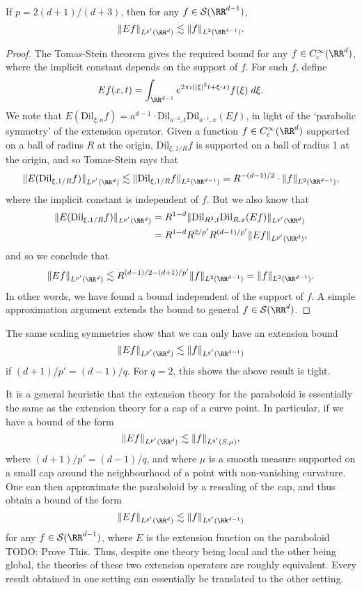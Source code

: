 \begin{theorem}
  If $p = 2(d+1)/(d+3)$, then for any $f \in \mathcal{S}(\RR^{d-1})$,
  \[ \| Ef \|_{L^{p'}(\RR^d)} \lesssim \| f \|_{L^2(\RR^{d-1})}. \]
\end{theorem}
\begin{proof}
  The Tomas-Stein theorem gives the required bound for any $f \in C_c^\infty(\RR^d)$, where the implicit constant depends on the support of $f$. For such $f$, define
  \[ Ef(x,t) = \int_{\RR^{d-1}} e^{2 \pi i (|\xi|^2 t + \xi \cdot x)} f(\xi)\; d\xi. \]
  We note that $E(\text{Dil}_{\xi,a} f) = a^{d-1} \cdot \text{Dil}_{a^{-2},t} \text{Dil}_{a^{-1},x}(Ef)$, in light of the `parabolic symmetry' of the extension operator. Given a function $f \in C_c^\infty(\RR^d)$ supported on a ball of radius $R$ at the origin, $\text{Dil}_{\xi,1/R} f$ is supported on a ball of radius 1 at the origin, and so Tomas-Stein says that
  \[ \| E(\text{Dil}_{\xi,1/R} f) \|_{L^{p'}(\RR^d)} \lesssim \| \text{Dil}_{\xi,1/R} f \|_{L^2(\RR^{d-1})} = R^{-(d-1)/2} \cdot \| f \|_{L^2(\RR^{d-1})}, \]
  where the implicit constant is independent of $f$. But we also know that
  \begin{align*}
    \| E(\text{Dil}_{\xi,1/R} f) \|_{L^{p'}(\RR^d)} &= R^{1-d} \| \text{Dil}_{R^2,t} \text{Dil}_{R,x}(Ef) \|_{L^{p'}(\RR^d)}\\
    &= R^{1-d} R^{2/p'} R^{(d-1)/p'} \| Ef \|_{L^{p'}(\RR^d)},
  \end{align*}
  and so we conclude that
  \[ \| Ef \|_{L^{p'}(\RR^d)} \lesssim R^{(d-1)/2-(d+1)/p'} \| f \|_{L^2(\RR^{d-1})} = \| f \|_{L^2(\RR^{d-1})}. \]
  In other words, we have found a bound independent of the support of $f$. A simple approximation argument extends the bound to general $f \in \mathcal{S}(\RR^d)$.
\end{proof}

\begin{remark}
  The same scaling symmetries show that we can only have an extension bound
  \[ \| Ef \|_{L^{p'}(\RR^d)} \lesssim \| f \|_{L^{q'}(\RR^{d-1})} \]
  if $(d+1)/p' = (d-1)/q$. For $q = 2$, this shows the above result is tight.
\end{remark}

It is a general heuristic that the extension theory for the paraboloid is essentially the same as the extension theory for a cap of a curve point. In particular, if we have a bound of the form
%
\[ \| Ef \|_{L^{p'}(\RR^d)} \lesssim \| f \|_{L^{q'}(S,\mu)}, \]
%
where $(d+1)/p' = (d-1)/q$, and where $\mu$ is a smooth measure supported on a small cap around the neighbourhood of a point with non-vanishing curvature. One can then approximate the paraboloid by a rescaling of the cap, and thus obtain a bound of the form
%
\[ \| Ef \|_{L^{p'}(\RR^d)} \lesssim \| f \|_{L^{q'}(\RR^{d-1})} \]
%
for any $f \in \mathcal{S}(\RR^{d-1})$, where $E$ is the extension function on the paraboloid TODO: Prove This. Thus, despite one theory being local and the other being global, the theories of these two extension operators are roughly equivalent. Every result obtained in one setting can essentially be translated to the other setting.

